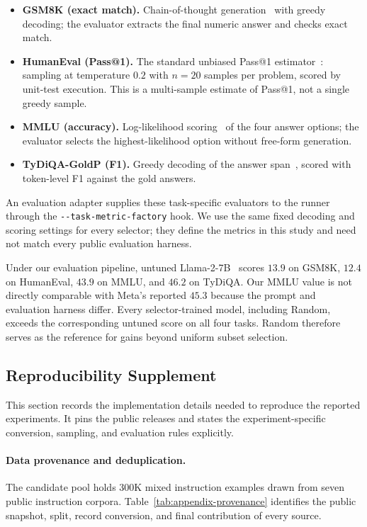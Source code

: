 \begin{itemize}
  \item \textbf{GSM8K (exact match).} Chain-of-thought generation~\cite{cobbe2021gsm8k} with greedy
    decoding; the evaluator extracts the final numeric answer and checks exact
    match.
  \item \textbf{HumanEval (Pass@1).} The standard unbiased Pass@1 estimator~\cite{chen2021humaneval}:
    sampling at temperature $0.2$ with $n{=}20$ samples per problem, scored by
    unit-test execution. This is a multi-sample estimate of Pass@1, not a single
    greedy sample.
  \item \textbf{MMLU (accuracy).} Log-likelihood scoring~\cite{hendrycks2021mmlu} of the four answer
    options; the evaluator selects the highest-likelihood option without
    free-form generation.
  \item \textbf{TyDiQA-GoldP (F1).} Greedy decoding of the answer span~\cite{clark2020tydiqa}, scored
    with token-level F1 against the gold answers.
\end{itemize}

An evaluation adapter supplies these task-specific evaluators to the runner
through the \texttt{-{}-task-metric-factory} hook. We use the same fixed decoding
and scoring settings for every selector; they define the metrics in this study
and need not match every public evaluation harness.

Under our evaluation pipeline, untuned Llama-2-7B~\cite{touvron2023llama2}
scores $13.9$ on GSM8K, $12.4$ on HumanEval, $43.9$ on MMLU, and $46.2$ on
TyDiQA. Our MMLU value is not directly comparable with Meta's reported $45.3$
because the prompt and evaluation harness differ. Every selector-trained model,
including Random, exceeds the corresponding untuned score on all four tasks.
Random therefore serves as the reference for gains beyond uniform subset
selection.

\subsection{Reproducibility Supplement}
\label{sec:appendix-repro}

This section records the implementation details needed to reproduce the
reported experiments. It pins the public releases and states the
experiment-specific conversion, sampling, and evaluation rules explicitly.

\paragraph{Data provenance and deduplication.}
The candidate pool holds 300K mixed instruction examples drawn from seven public
instruction corpora. Table~\ref{tab:appendix-provenance} identifies the public
snapshot, split, record conversion, and final contribution of every source.


